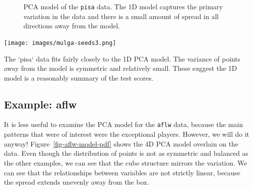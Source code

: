 \documentclass[
  letterpaper,
]{krantz}
\newcommand{\insightbox}[1]{%
\noindent\colorbox{insight!30}{%
\begin{minipage}{0.98\textwidth}%
    \centering%
    \begin{minipage}[c]{0.15\textwidth} %
      \texttt{[image: images/mulga-seeds3.png]} %
    \end{minipage}%
    \hfill %
    \begin{minipage}[c]{0.8\textwidth} %
      \bigskip%
      \textsf{#1}%
      \bigskip%
    \end{minipage}%
    \hspace*{3mm}%
  \end{minipage}%
}%
}
\begin{document}
\begin{figure}


\caption{\label{fig-pisa-model-pdf}PCA model of the \texttt{pisa} data.
The 1D model captures the primary variation in the data and there is a
small amount of spread in all directions away from the model.
}

\end{figure}%

\insightbox{The `pisa` data fits fairly closely to the 1D PCA model. The variance of points away from the model is symmetric and relatively small. These suggest the 1D model is a reasonably summary of the test scores.}

\subsection{Example: aflw}\label{example-aflw-1}


It is less useful to examine the PCA model for the \texttt{aflw} data,
because the main patterns that were of interest were the exceptional
players. However, we will do it anyway! Figure~\ref{fig-aflw-model-pdf}
shows the 4D PCA model overlain on the data. Even though the
distribution of points is not as symmetric and balanced as the other
examples, we can see that the cube structure mirrors the variation. We
can see that the relationships between variables are not strictly
linear, because the spread extends unevenly away from the box.
\end{document}
